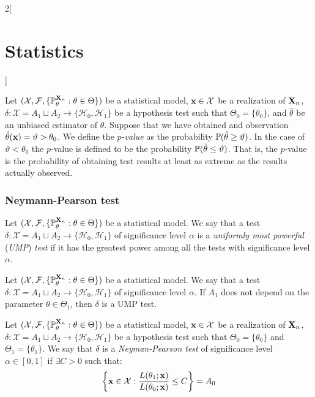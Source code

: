 \documentclass[../../../main.tex]{subfiles}
\begin{document}
\begin{multicols}{2}[\section{Statistics}]
\begin{definition}
    Let $(\mathcal{X},\mathcal{F},\{\mathbb{P}_\theta^{\boldsymbol{\mathrm{X}}_n}:\theta\in\Theta\})$ be a statistical model, $\boldsymbol{\mathrm{x}}\in\mathcal{X}$ be a realization of $\boldsymbol{\mathrm{X}}_n$, $\delta:\mathcal{X}=A_1\sqcup A_2\rightarrow\{\mathcal{H}_0,\mathcal{H}_1\}$ be a hypothesis test such that $\Theta_0=\{\theta_0\}$, and $\hat{\theta}$ be an unbiased estimator of $\theta$. Suppose that we have obtained and observation $\hat{\theta}(\boldsymbol{\mathrm{x}})=\vartheta>\theta_0$. We define the \emph{$p$-value} as the probability $\mathbb{P}(\hat{\theta}\geq\vartheta)$. In the case of $\vartheta<\theta_0$ the $p$-value is defined to be the probability $\mathbb{P}(\hat{\theta}\leq\vartheta)$. That is, the $p$-value is the probability of obtaining test results at least as extreme as the results actually observed.
  \end{definition}
  \subsubsection{Neymann-Pearson test}
  \begin{definition}
    Let $(\mathcal{X},\mathcal{F},\{\mathbb{P}_\theta^{\boldsymbol{\mathrm{X}}_n}:\theta\in\Theta\})$ be a statistical model. We say that a test $\delta:\mathcal{X}=A_1\sqcup A_2\rightarrow\{\mathcal{H}_0,\mathcal{H}_1\}$ of significance level $\alpha$ is a \emph{uniformly most powerful} (\emph{UMP}) \emph{test} if it has the greatest power among all the tests with significance level $\alpha$.
  \end{definition}
  \begin{lemma}
    Let $(\mathcal{X},\mathcal{F},\{\mathbb{P}_\theta^{\boldsymbol{\mathrm{X}}_n}:\theta\in\Theta\})$ be a statistical model. We say that a test $\delta:\mathcal{X}=A_1\sqcup A_2\rightarrow\{\mathcal{H}_0,\mathcal{H}_1\}$ of significance level $\alpha$. If $A_1$ does not depend on the parameter $\theta\in\Theta_1$, then $\delta$ is a UMP test.
  \end{lemma}
  \begin{definition}
    Let $(\mathcal{X},\mathcal{F},\{\mathbb{P}_\theta^{\boldsymbol{\mathrm{X}}_n}:\theta\in\Theta\})$ be a statistical model, $\boldsymbol{\mathrm{x}}\in\mathcal{X}$ be a realization of $\boldsymbol{\mathrm{X}}_n$, $\delta:\mathcal{X}=A_1\sqcup A_2\rightarrow\{\mathcal{H}_0,\mathcal{H}_1\}$ be a hypothesis test such that $\Theta_0=\{\theta_0\}$ and $\Theta_1=\{\theta_1\}$. We say that $\delta$ is a \emph{Neyman-Pearson test} of significance level $\alpha\in[0,1]$ if $\exists C>0$ such that:
    \begin{gather*}
      \left\{\vf{x}\in\mathcal{X}:\frac{L(\theta_1;\vf{x})}{L(\theta_0;\vf{x})}\leq C\right\}= A_0\\

\end{gather*}
\end{definition}
\end{multicols}
\end{document}
